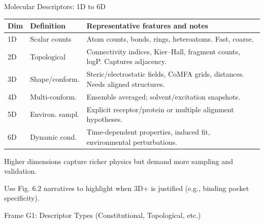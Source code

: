 \documentclass[aspectratio=169,11pt]{beamer}
\begin{document}
\begin{frame}{Molecular Descriptors: 1D to 6D}
  {\small
  \begin{tabular}{p{}p{}p{}}
    \toprule
    \textbf{Dim} & \textbf{Definition} & \textbf{Representative features and notes}\\
    \midrule
    1D & Scalar counts & Atom counts, bonds, rings, heteroatoms. Fast, coarse.\\
    2D & Topological & Connectivity indices, Kier--Hall, fragment counts, logP. Captures adjacency.\\
    3D & Shape/conform. & Steric/electrostatic fields, CoMFA grids, distances. Needs aligned structures.\\
    4D & Multi-conform. & Ensemble averaged; solvent/excitation snapshots.\\
    5D & Environ. sampl. & Explicit receptor/protein or multiple alignment hypotheses.\\
    6D & Dynamic cond. & Time-dependent properties, induced fit, environmental perturbations.\\
    \bottomrule
  \end{tabular}
  }
  \iqbsmallsep
  \begin{iqbitemize}
    \item Higher dimensions capture richer physics but demand more sampling and validation.
    \item Use Fig. 6.2 narratives to highlight when 3D+ is justified (e.g., binding pocket specificity).
  \end{iqbitemize}
\end{frame}Frame G1: Descriptor Types (Constitutional, Topological, etc.)
\end{document}
